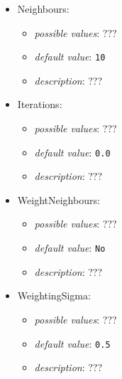 \documentclass{article}
\begin{document}
\begin{itemize}
    \item Neighbours:
           \begin{itemize}
                \item \emph{possible values}: ???
                \item \emph{default value}: \texttt{10}
                \item \emph{description}: ???
           \end{itemize}
    \item Iterations:
           \begin{itemize}
                \item \emph{possible values}: ???
                \item \emph{default value}: \texttt{0.0}
                \item \emph{description}: ???
           \end{itemize}
    \item WeightNeighbours:
           \begin{itemize}
                \item \emph{possible values}: ???
                \item \emph{default value}: \texttt{No}
                \item \emph{description}: ???
           \end{itemize}
    \item WeightingSigma:
           \begin{itemize}
                \item \emph{possible values}: ???
                \item \emph{default value}: \texttt{0.5}
                \item \emph{description}: ???
           \end{itemize}
\end{itemize}
\end{document}
